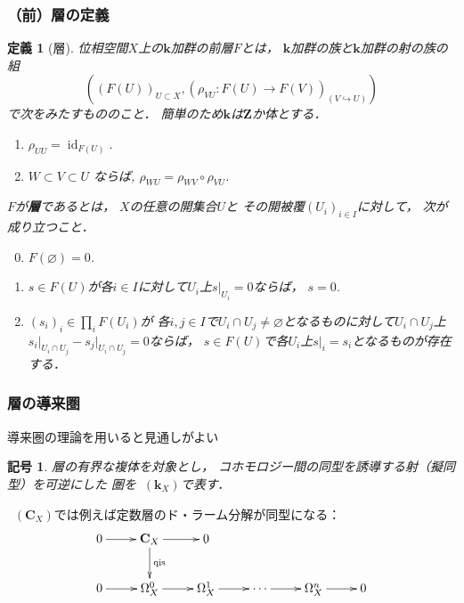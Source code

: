 \documentclass[dvipdfmx,10pt,aspectratio=169,leqno]{beamer}%
\newcommand{\zz}{\mathbf{Z}}
\newcommand{\cc}{\mathbf{C}}
\newcommand{\kk}{\mathbf{k}}
\numberwithin{equation}{subsection}
\newcommand{\id}{\mathop{\mathrm{id}}\nolimits}
\newcommand{\Dompb}{\mathop{\mathsf{D}^\mathrm{b}}\nolimits}
\theoremstyle{mystyle}
\newtheorem{DFN}[AXM]{定義}
\newtheorem{NTN}[AXM]{記号}
\begin{document}
\begin{frame}
    \frametitle{（前）層の定義}
    \begin{DFN}[層]\label{def:sheaf}
        位相空間\(X\)上の\(\kk\)加群の前層\(F\)とは，
        \(\kk\)加群の族と\(\kk\)加群の射の族の組\[\left(
        \left(F(U)\right)_{U\subset X},
        \left(\rho_{VU}\colon F(U)\to F(V)\right)_{(V\hookrightarrow U)}
        \right)\]で次をみたすもののこと．
        簡単のため\(\kk\)は\(\zz\)か体とする．
        \vspace*{-5pt}
        \begin{enumerate}
            \item $\rho_{UU} = \id_{F(U)}$. 
            \item $W \subset V \subset U$ ならば, 
            $\rho_{WU} = \rho_{WV} \circ \rho_{VU}$.\label{enum:res}
        \end{enumerate}
        \vspace*{-5pt}
        \(F\)が\textbf{層}であるとは，
        \(X\)の任意の開集合\(U\)と
        その開被覆\(\left(U_i\right)_{i\in I}\)に対して，
        次が成り立つこと．
        \vspace*{-5pt}
        \begin{enumerate}[(S1)]
            \setcounter{enumi}{-1}
            \setlength{\leftskip}{10pt}
            \item \(F(\varnothing)=0\).
            \item \(s\in F(U)\)が各\(i\in I\)に対して\(U_i\)上\(s\rvert_{U_{i}}=0\)ならば，
            \(s=0\).\label{sheaf-cond1}
            \item \(\left(s_i\right)_i\in\prod_{i}F(U_i)\)が
            各\(i,j\in I\)で\(U_i\cap U_j\ne\varnothing\)となるものに対して\(U_i\cap U_j\)上\(s_i\rvert_{U_i\cap U_j}-s_j\rvert_{U_i\cap U_j}=0\)ならば，
            \(s\in F(U)\)で各\(U_i\)上\(s\rvert_i=s_i\)となるものが存在する．\label{sheaf-cond2}
        \end{enumerate}
    \end{DFN}
\end{frame}

\begin{frame}
    \frametitle{層の導来圏}
    導来圏の理論を用いると見通しがよい
    \begin{NTN}
        層の有界な複体を対象とし，
        コホモロジー間の同型を誘導する射（擬同型）を可逆にした
        圏を\(\Dompb(\kk_X)\)で表す．
    \end{NTN}
    \(\Dompb(\cc_X)\)では例えば定数層のド・ラーム分解が同型になる：
    \[\vcenter{\xymatrix{
        0\ar[r]&
        \cc_X \ar[r] \ar[d]^-{\mathrm{qis}}&
        0\\
        0\ar[r]&
        \Omega_X^0\ar[r]&
        \Omega_X^1\ar[r]&
        \cdots\ar[r]&
        \Omega_X^n\ar[r]&0
    }}\]
\end{frame}
\end{document}

